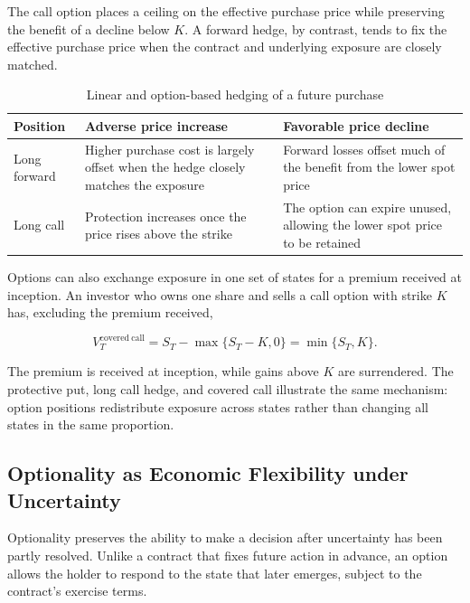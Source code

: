 The call option places a ceiling on the effective purchase price while preserving the benefit of a decline below \(K\). A forward hedge, by contrast, tends to fix the effective purchase price when the contract and underlying exposure are closely matched.

\begin{table}[H]
\centering
\caption{Linear and option-based hedging of a future purchase}
\label{tab:ch18-forward-option-hedge}
\begin{tabularx}{\textwidth}{@{}p{3.2cm}YY@{}}
\toprule
\textbf{Position} &
\textbf{Adverse price increase} &
\textbf{Favorable price decline} \\
\midrule
Long forward &
Higher purchase cost is largely offset when the hedge closely matches the exposure &
Forward losses offset much of the benefit from the lower spot price \\
Long call &
Protection increases once the price rises above the strike &
The option can expire unused, allowing the lower spot price to be retained \\
\bottomrule
\end{tabularx}
\end{table}

Options can also exchange exposure in one set of states for a premium received at inception. An investor who owns one share and sells a call option with strike \(K\) has, excluding the premium received,

\begin{equation}
V_T^{\mathrm{covered\ call}}
=S_T-\max\{S_T-K,0\}
=\min\{S_T,K\}.
\label{eq:ch18-covered-call}
\end{equation}

The premium is received at inception, while gains above \(K\) are surrendered. The protective put, long call hedge, and covered call illustrate the same mechanism: option positions redistribute exposure across states rather than changing all states in the same proportion.



\subsection[Optionality as Economic Flexibility under Uncertainty]{Optionality as Economic Flexibility under Uncertainty}

Optionality preserves the ability to make a decision after uncertainty has been partly resolved. Unlike a contract that fixes future action in advance, an option allows the holder to respond to the state that later emerges, subject to the contract's exercise terms.

